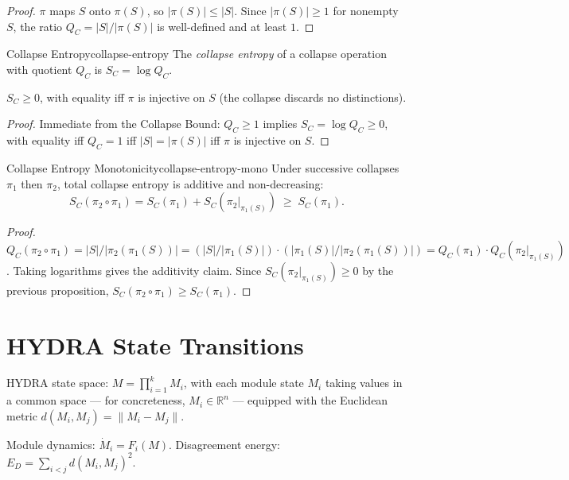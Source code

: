 \documentclass[12pt,twoside,openright]{book}
\newenvironment{prop}
{\begin{proposition}{}{}}
{\end{proposition}}
\begin{document}
\begin{proof}
  $\pi$ maps $S$ onto $\pi(S)$, so $|\pi(S)| \le |S|$.
  Since $|\pi(S)| \ge 1$ for nonempty $S$, the ratio
  $Q_C = |S|/|\pi(S)|$ is well-defined and at least $1$.
\end{proof}

\begin{definition}{Collapse Entropy}{collapse-entropy}
  The \emph{collapse entropy} of a collapse operation with
  quotient $Q_C$ is $S_C = \log Q_C$.
\end{definition}

\begin{prop}
  $S_C \ge 0$, with equality iff $\pi$ is injective on $S$
  (the collapse discards no distinctions).
\end{prop}

\begin{proof}
  Immediate from the Collapse Bound: $Q_C \ge 1$ implies
  $S_C = \log Q_C \ge 0$, with equality iff $Q_C = 1$ iff
  $|S| = |\pi(S)|$ iff $\pi$ is injective on $S$.
\end{proof}

\begin{theorem}{Collapse Entropy Monotonicity}{collapse-entropy-mono}
  Under successive collapses $\pi_1$ then $\pi_2$, total
  collapse entropy is additive and non-decreasing:
  \[
    S_C(\pi_2 \circ \pi_1) = S_C(\pi_1) + S_C(\pi_2|_{\pi_1(S)})
    \;\ge\; S_C(\pi_1).
  \]
\end{theorem}

\begin{proof}
  $Q_C(\pi_2 \circ \pi_1)
  = |S| / |\pi_2(\pi_1(S))|
  = (|S|/|\pi_1(S)|) \cdot (|\pi_1(S)|/|\pi_2(\pi_1(S))|)
  = Q_C(\pi_1) \cdot Q_C(\pi_2|_{\pi_1(S)})$.
  Taking logarithms gives the additivity claim. Since
  $S_C(\pi_2|_{\pi_1(S)}) \ge 0$ by the previous proposition,
  $S_C(\pi_2 \circ \pi_1) \ge S_C(\pi_1)$.
\end{proof}

\section{HYDRA State Transitions}

HYDRA state space: $M = \prod_{i=1}^k M_i$, with each
module state $M_i$ taking values in a common space — for
concreteness, $M_i \in \mathbb{R}^n$ — equipped with the
Euclidean metric $d(M_i, M_j) = \|M_i - M_j\|$.

Module dynamics: $\dot{M}_i = F_i(M)$.
Disagreement energy: $E_D = \sum_{i<j} d(M_i, M_j)^2$.
\end{document}
